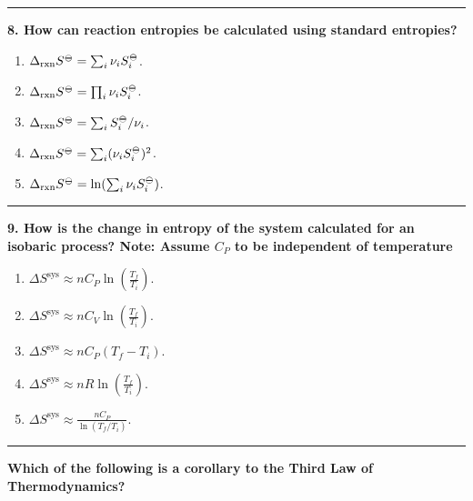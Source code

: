 \documentclass[
  9pt,
]{extbook}
\providecommand{\tightlist}{%
  \setlength{\itemsep}{0pt}\setlength{\parskip}{0pt}}
\theoremstyle{definition}
\theoremstyle{definition}
\theoremstyle{definition}
\theoremstyle{definition}
\theoremstyle{remark}
\begin{document}
\begin{center}\rule{0.5\linewidth}{0.5pt}\end{center}

\textbf{8. How can reaction entropies be calculated using standard entropies?}

\begin{enumerate}
\def\labelenumi{\alph{enumi}.}
\tightlist
\item
  \(\Delta_{\text{rxn}} S^{-\kern-6pt{\ominus}\kern-6pt-}= \sum_i \nu_i S^{-\kern-6pt{\ominus}\kern-6pt-}_i\).
\item
  \(\Delta_{\text{rxn}} S^{-\kern-6pt{\ominus}\kern-6pt-}= \prod_i \nu_i S^{-\kern-6pt{\ominus}\kern-6pt-}_i\).
\item
  \(\Delta_{\text{rxn}} S^{-\kern-6pt{\ominus}\kern-6pt-}= \sum_i S^{-\kern-6pt{\ominus}\kern-6pt-}_i / \nu_i\).
\item
  \(\Delta_{\text{rxn}} S^{-\kern-6pt{\ominus}\kern-6pt-}= \sum_i (\nu_i S^{-\kern-6pt{\ominus}\kern-6pt-}_i)^2\).
\item
  \(\Delta_{\text{rxn}} S^{-\kern-6pt{\ominus}\kern-6pt-}= \ln(\sum_i \nu_i S^{-\kern-6pt{\ominus}\kern-6pt-}_i)\).
\end{enumerate}

\begin{center}\rule{0.5\linewidth}{0.5pt}\end{center}

\textbf{9. How is the change in entropy of the system calculated for an isobaric process? Note: Assume \(C_P\) to be independent of temperature}

\begin{enumerate}
\def\labelenumi{\alph{enumi}.}
\tightlist
\item
  \(\Delta S^{\text{sys}} \approx nC_P \ln \left(\frac{T_f}{T_i}\right)\).
\item
  \(\Delta S^{\text{sys}} \approx nC_V \ln \left(\frac{T_f}{T_i}\right)\).
\item
  \(\Delta S^{\text{sys}} \approx nC_P (T_f - T_i)\).
\item
  \(\Delta S^{\text{sys}} \approx nR \ln \left(\frac{T_f}{T_i}\right)\).
\item
  \(\Delta S^{\text{sys}} \approx \frac{nC_P}{\ln (T_f/T_i)}\).
\end{enumerate}

\begin{center}\rule{0.5\linewidth}{0.5pt}\end{center}

\textbf{Which of the following is a corollary to the Third Law of Thermodynamics?}
\end{document}
